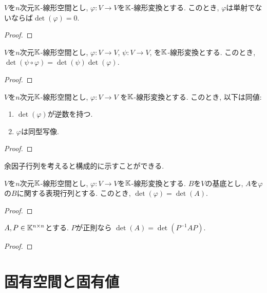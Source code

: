 \begin{lemma}
  $V$を$n$次元$\mathbb{K}$-線形空間とし,
  $\varphi\colon V \to V$を$\mathbb{K}$-線形変換とする.
  このとき,
  $\varphi$は単射でないならば$\det(\varphi)= 0$.
\end{lemma}
\begin{proof}\end{proof}


\begin{prop}
  $V$を$n$次元$\mathbb{K}$-線形空間とし,
  $\varphi\colon V \to V$,
  $\psi\colon V \to V$,
  を$\mathbb{K}$-線形変換とする.
  このとき,
  $\det(\psi\circ \varphi)=\det(\psi)\det(\varphi)$. 
\end{prop}
\begin{proof}\end{proof}

\begin{prop}
  $V$を$n$次元$\mathbb{K}$-線形空間とし,
  $\varphi\colon V \to V$
  を$\mathbb{K}$-線形変換とする.
  このとき,
  以下は同値:
  \begin{enumerate}
  \item $\det(\varphi)$が逆数を持つ.
  \item $\varphi$は同型写像.
  \end{enumerate}
\end{prop}
\begin{proof}\end{proof}
\begin{remark}余因子行列を考えると構成的に示すことができる.\end{remark}


\begin{prop}
  $V$を$n$次元$\mathbb{K}$-線形空間とし,
  $\varphi\colon V \to V$を$\mathbb{K}$-線形変換とする.
  $B$を$V$の基底とし,
  $A$を$\varphi$の$B$に関する表現行列とする.
  このとき,
  $\det(\varphi)=\det(A)$. 
\end{prop}
\begin{proof}\end{proof}

\begin{cor}
  $A, P \in \mathbb{K}^{n\times n}$とする.
  $P$が正則なら
  $\det(A)=\det(P^{-1}AP)$. 
\end{cor}
\begin{proof}\end{proof}


\begin{quiz}
\end{quiz}

\chapter{固有空間と固有値}
\label{chap:eigen}
